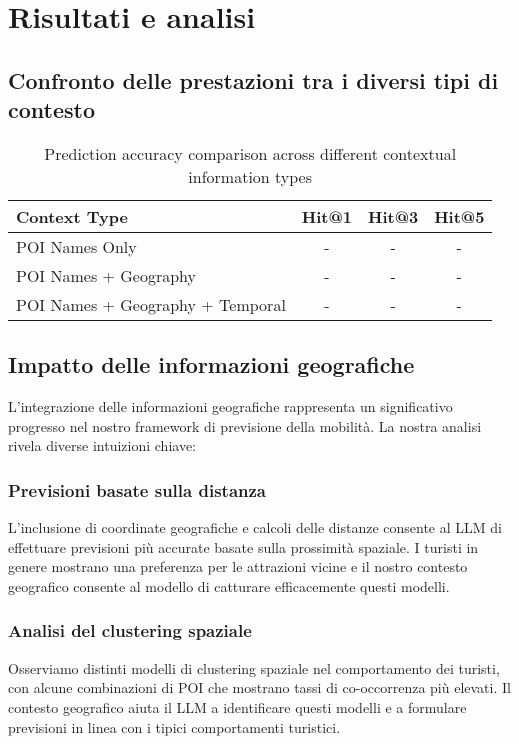 \section{Risultati e analisi}

\subsection{Confronto delle prestazioni tra i diversi tipi di contesto}

\begin{table}[H]
\centering
\caption{Prediction accuracy comparison across different contextual information types}
\label{tab:context_comparison}
\begin{tabular}{@{}lccc@{}}
\toprule
Context Type & Hit@1 & Hit@3 & Hit@5 \\
\midrule
POI Names Only & - & - & - \\
POI Names + Geography & - & - & - \\
POI Names + Geography + Temporal & - & - & - \\
\bottomrule
\end{tabular}
\end{table}

\subsection{Impatto delle informazioni geografiche}

L'integrazione delle informazioni geografiche rappresenta un significativo progresso nel nostro framework di previsione della mobilità. La nostra analisi rivela diverse intuizioni chiave:

\subsubsection{Previsioni basate sulla distanza}
L'inclusione di coordinate geografiche e calcoli delle distanze consente al LLM di effettuare previsioni più accurate basate sulla prossimità spaziale. I turisti in genere mostrano una preferenza per le attrazioni vicine e il nostro contesto geografico consente al modello di catturare efficacemente questi modelli.

\subsubsection{Analisi del clustering spaziale}
Osserviamo distinti modelli di clustering spaziale nel comportamento dei turisti, con alcune combinazioni di POI che mostrano tassi di co-occorrenza più elevati. Il contesto geografico aiuta il LLM a identificare questi modelli e a formulare previsioni in linea con i tipici comportamenti turistici.

